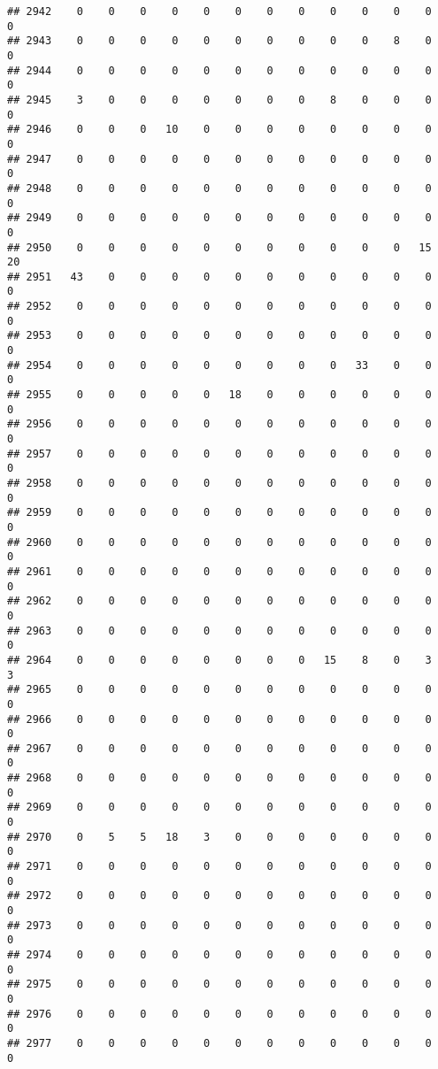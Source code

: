 \documentclass[]{article}
\begin{document}
\begin{verbatim}
## 2942    0    0    0    0    0    0    0    0    0    0    0    0    0
## 2943    0    0    0    0    0    0    0    0    0    0    8    0    0
## 2944    0    0    0    0    0    0    0    0    0    0    0    0    0
## 2945    3    0    0    0    0    0    0    0    8    0    0    0    0
## 2946    0    0    0   10    0    0    0    0    0    0    0    0    0
## 2947    0    0    0    0    0    0    0    0    0    0    0    0    0
## 2948    0    0    0    0    0    0    0    0    0    0    0    0    0
## 2949    0    0    0    0    0    0    0    0    0    0    0    0    0
## 2950    0    0    0    0    0    0    0    0    0    0    0   15   20
## 2951   43    0    0    0    0    0    0    0    0    0    0    0    0
## 2952    0    0    0    0    0    0    0    0    0    0    0    0    0
## 2953    0    0    0    0    0    0    0    0    0    0    0    0    0
## 2954    0    0    0    0    0    0    0    0    0   33    0    0    0
## 2955    0    0    0    0    0   18    0    0    0    0    0    0    0
## 2956    0    0    0    0    0    0    0    0    0    0    0    0    0
## 2957    0    0    0    0    0    0    0    0    0    0    0    0    0
## 2958    0    0    0    0    0    0    0    0    0    0    0    0    0
## 2959    0    0    0    0    0    0    0    0    0    0    0    0    0
## 2960    0    0    0    0    0    0    0    0    0    0    0    0    0
## 2961    0    0    0    0    0    0    0    0    0    0    0    0    0
## 2962    0    0    0    0    0    0    0    0    0    0    0    0    0
## 2963    0    0    0    0    0    0    0    0    0    0    0    0    0
## 2964    0    0    0    0    0    0    0    0   15    8    0    3    3
## 2965    0    0    0    0    0    0    0    0    0    0    0    0    0
## 2966    0    0    0    0    0    0    0    0    0    0    0    0    0
## 2967    0    0    0    0    0    0    0    0    0    0    0    0    0
## 2968    0    0    0    0    0    0    0    0    0    0    0    0    0
## 2969    0    0    0    0    0    0    0    0    0    0    0    0    0
## 2970    0    5    5   18    3    0    0    0    0    0    0    0    0
## 2971    0    0    0    0    0    0    0    0    0    0    0    0    0
## 2972    0    0    0    0    0    0    0    0    0    0    0    0    0
## 2973    0    0    0    0    0    0    0    0    0    0    0    0    0
## 2974    0    0    0    0    0    0    0    0    0    0    0    0    0
## 2975    0    0    0    0    0    0    0    0    0    0    0    0    0
## 2976    0    0    0    0    0    0    0    0    0    0    0    0    0
## 2977    0    0    0    0    0    0    0    0    0    0    0    0    0

\end{verbatim}
\end{document}
